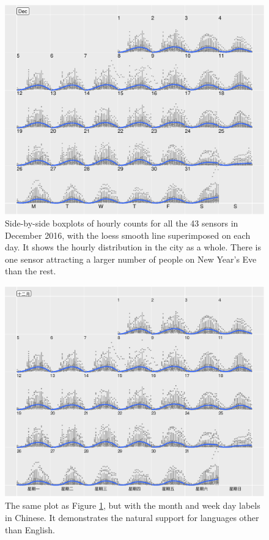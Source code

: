 \documentclass[12pt]{article}
\begin{document}
\begin{figure}

{\centering \includegraphics[width=\textwidth]{figure/boxplot-1} 

}

\caption{Side-by-side boxplots of hourly counts for all the 43 sensors in December 2016, with the loess smooth line superimposed on each day. It shows the hourly distribution in the city as a whole. There is one sensor attracting a larger number of people on New Year's Eve than the rest.}\label{fig:boxplot}
\end{figure}

\begin{figure}

{\centering \includegraphics[width=\textwidth]{img/chn-1-embedded} 

}

\caption{The same plot as Figure \ref{fig:boxplot}, but with the month and week day labels in Chinese. It demonstrates the natural support for languages other than English.}\label{fig:chn-embedded}
\end{figure}
\end{document}
